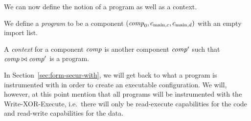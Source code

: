 \documentclass[acmsmall,review,anonymous]{acmart}\settopmatter{printfolios=true,printccs=false,printacmref=false}
\begin{document}
We can now define the notion of a program as well as a context.
\begin{definition}
  \label{def:program-and-context}
  We define a \emph{program} to be a component $(\mathit{comp}_0,c_{\mathrm{main},c}, c_{\mathrm{main},d})$ with an empty import list.

  A \emph{context} for a component $\mathit{comp}$ is another component $\mathit{comp}'$ such that $\mathit{comp} \bowtie \mathit{comp}'$ is a program.
\end{definition}
In Section~\ref{sec:form-secur-with}, we will get back to what a program is instrumented with in order to create an executable configuration. 
We will, however, at this point mention that all programs will be instrumented with the Write-XOR-Execute, i.e.\ there will only be read-execute capabilities for the code and read-write capabilities for the data.
\end{document}
